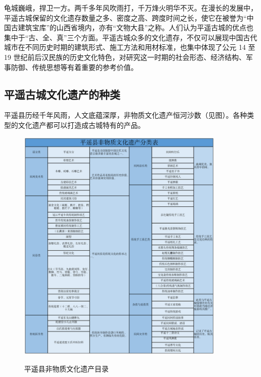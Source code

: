 \documentclass[UTF8]{ctexart}
\begin{document}
龟城巍峨，捍卫一方。两千多年风吹雨打，千万烽火明华不灭。在漫长的发展中，平遥古城保留的文化遗存数量之多、密度之高、跨度时间之长，使它在被誉为“中国古建筑宝库”的山西省境内，亦有“文物大县”之称。人们认为平遥古城的优点也集中于“古、全、真”三个方面。平遥古城众多的文化遗存，不仅可以展现中国古代城市在不同历史时期的建筑形式、施工方法和用材标准，也集中体现了公元 14 至 19 世纪前后汉民族的历史文化特色，对研究这一时期的社会形态、经济结构、军事防御、传统思想等有着重要的参考价值。
    \subsection{平遥古城文化遗产的种类}
平遥县历经千年风雨，人文底蕴深厚，非物质文化遗产恒河沙数（见图）。各种类型的文化遗产都可以打造成古城特有的产品。
\begin{figure}[H]
    \centering
    \caption{平遥县非物质文化遗产目录}
    \includegraphics[width=10cm]{非物质文化遗产.png}
    \label{fig:my_label}
\end{figure}
\end{document}
